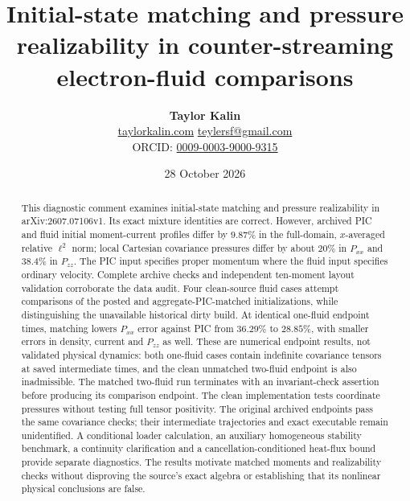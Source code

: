 \documentclass[11pt]{article}
\title{Initial-state matching and pressure realizability in counter-streaming electron-fluid comparisons}
\author{\textbf{Taylor Kalin}\\[3pt]
\small\href{https://taylorkalin.com}{taylorkalin.com}\quad
\href{mailto:teylersf@gmail.com}{teylersf@gmail.com}\\
\small ORCID: \href{https://orcid.org/0009-0003-9000-9315}{0009-0003-9000-9315}}
\date{28 October 2026}
\begin{document}
\maketitle
\begin{abstract}
This diagnostic comment examines initial-state matching and pressure
realizability in arXiv:2607.07106v1. Its exact mixture identities are correct.
However, archived PIC and fluid initial moment-current profiles differ by
$9.87\%$ in the full-domain, $x$-averaged relative $\ell^2$ norm; local
Cartesian covariance pressures differ by about $20\%$ in $P_{xx}$ and
$38.4\%$ in $P_{zz}$. The PIC input specifies proper momentum where the
fluid input specifies ordinary velocity. Complete archive checks and
independent ten-moment layout validation corroborate the data audit.
Four clean-source fluid cases attempt comparisons of the posted and
aggregate-PIC-matched initializations, while distinguishing the unavailable
historical dirty build.
At identical one-fluid endpoint times, matching lowers $P_{xx}$ error against
PIC from $36.29\%$ to $28.85\%$, with smaller errors in density, current
and $P_{zz}$ as well. These are numerical endpoint results, not validated
physical dynamics: both one-fluid cases contain indefinite covariance
tensors at saved intermediate times, and the clean unmatched two-fluid
endpoint is also inadmissible. The matched two-fluid run terminates with an
invariant-check assertion before producing its comparison endpoint.
The clean implementation tests coordinate
pressures without testing full tensor positivity. The original archived
endpoints pass the same covariance checks; their intermediate trajectories
and exact executable remain unidentified. A conditional loader calculation,
an auxiliary homogeneous stability benchmark, a continuity clarification and
a cancellation-conditioned heat-flux bound provide separate diagnostics.
The results motivate matched moments and realizability checks without
disproving the source's exact algebra or establishing that its nonlinear
physical conclusions are false.
\end{abstract}









\end{document}
